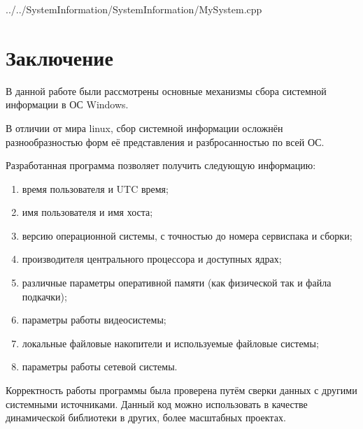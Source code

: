 \documentclass[a4paper, 12pt]{report}		%
\begin{document}

{../../SystemInformation/SystemInformation/MySystem.cpp}

\chapter*{Заключение}

\vspace{1em}

В данной работе были рассмотрены основные механизмы сбора системной информации в ОС Windows.
\vspace{1em}

В отличии от мира linux, сбор системной информации осложнён разнообразностью форм её представления и разбросанностью по всей ОС.
\vspace{1em}

Разработанная программа позволяет получить следующую информацию:
\begin{enumerate}
\item время пользователя и UTC время;
\item имя пользователя и имя хоста;
\item версию операционной системы, с точностью до номера сервиспака и сборки;
\item производителя центрального процессора и доступных ядрах;
\item различные параметры оперативной памяти (как физической так и файла подкачки);
\item параметры работы видеосистемы;
\item локальные файловые накопители и используемые файловые системы;
\item параметры работы сетевой системы.
\end{enumerate}
\vspace{1em}

Корректность работы программы была проверена путём сверки данных с другими системными источниками. Данный код можно использовать в качестве динамической библиотеки в других, более масштабных проектах.
\end{document}
